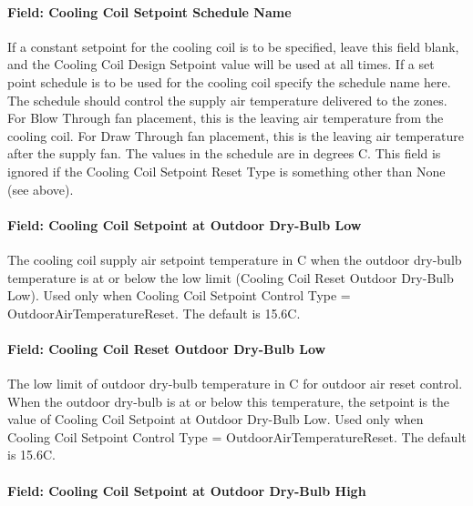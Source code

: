 \paragraph{Field: Cooling Coil Setpoint Schedule Name}\label{field-cooling-coil-setpoint-schedule-name-3}

If a constant setpoint for the cooling coil is to be specified, leave this field blank, and the Cooling Coil Design Setpoint value will be used at all times. If a set point schedule is to be used for the cooling coil specify the schedule name here. The schedule should control the supply air temperature delivered to the zones. For Blow Through fan placement, this is the leaving air temperature from the cooling coil. For Draw Through fan placement, this is the leaving air temperature after the supply fan. The values in the schedule are in degrees C. This field is ignored if the Cooling Coil Setpoint Reset Type is something other than None (see above).

\paragraph{Field: Cooling Coil Setpoint at Outdoor Dry-Bulb Low}\label{field-cooling-coil-setpoint-at-outdoor-dry-bulb-low-1}

The cooling coil supply air setpoint temperature in C when the outdoor dry-bulb temperature is at or below the low limit (Cooling Coil Reset Outdoor Dry-Bulb Low). Used only when Cooling Coil Setpoint Control Type = OutdoorAirTemperatureReset. The default is 15.6C.

\paragraph{Field: Cooling Coil Reset Outdoor Dry-Bulb Low}\label{field-cooling-coil-reset-outdoor-dry-bulb-low-1}

The low limit of outdoor dry-bulb temperature in C for outdoor air reset control. When the outdoor dry-bulb is at or below this temperature, the setpoint is the value of Cooling Coil Setpoint at Outdoor Dry-Bulb Low. Used only when Cooling Coil Setpoint Control Type = OutdoorAirTemperatureReset. The default is 15.6C.

\paragraph{Field: Cooling Coil Setpoint at Outdoor Dry-Bulb High}\label{field-cooling-coil-setpoint-at-outdoor-dry-bulb-high-1}

